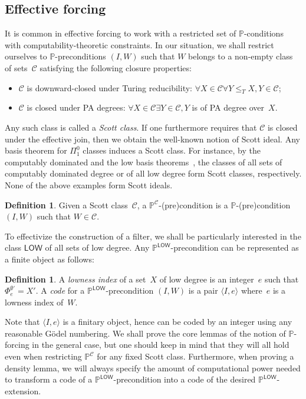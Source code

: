 \documentclass{article}
\def\PP{\mathbb{P}}
\def\C{\mathcal{C}}
\numberwithin{theorem}{section}
\theoremstyle{definition}
\newtheorem{definition}[theorem]{Definition}
\begin{document}
\subsection{Effective forcing}

It is common in effective forcing to work with a restricted set of $\PP$-conditions with computability-theoretic constraints. In our situation, we shall restrict ourselves to $\PP$-preconditions $(I, W)$ such that $W$ belongs to a non-empty class of sets~$\C$ satisfying the following closure properties:
\begin{itemize}
    \item[(1)] $\C$ is downward-closed under Turing reducibility: $\forall X \in \C \forall Y \leq_T X, Y \in \C$;
    \item[(2)] $\C$ is closed under PA degrees: $\forall X \in \C \exists Y \in \C, Y $ is of PA degree over~$X$.
\end{itemize}
Any such class is called a \emph{Scott class}. If one furthermore requires that $\C$ is closed under the effective join, then we obtain the well-known notion of Scott ideal.
Any basis theorem for $\Pi^0_1$ classes induces a Scott class. For instance, by the computably dominated and the low basis theorems~\cite{jockusch1972pi}, the classes of all sets of computably dominated degree or of all low degree form Scott classes, respectively. None of the above examples form Scott ideals.

\begin{definition}
Given a Scott class~$\C$, a $\PP^\C$-(pre)condition is a $\PP$-(pre)condition $(I, W)$ such that $W \in \C$.
\end{definition}

To effectivize the construction of a filter, we shall be particularly interested in the class $\mathsf{LOW}$ of all sets of low degree. Any $\PP^{\mathsf{LOW}}$-precondition can be represented as a finite object as follows:

\begin{definition}
A \emph{lowness index} of a set~$X$ of low degree is an integer~$e$ such that $\Phi_e^{\emptyset'} = X'$.
A \emph{code} for a $\PP^{\mathsf{LOW}}$-precondition $(I, W)$ is a pair $\langle I, e\rangle$ where~$e$ is a lowness index of~$W$.
\end{definition}

Note that $\langle I, e\rangle$ is a finitary object, hence can be coded by an integer using any reasonable G\"odel numbering. We shall prove the core lemmas of the notion of $\PP$-forcing in the general case, but one should keep in mind that they will all hold even when restricting $\PP^\C$ for any fixed Scott class. Furthermore, when proving a density lemma, we will always specify the amount of computational power needed to transform a code of a $\PP^{\mathsf{LOW}}$-precondition into a code of the desired $\PP^{\mathsf{LOW}}$-extension.
\end{document}

